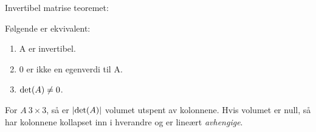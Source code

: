 Invertibel matrise teoremet:

Følgende er ekvivalent:
\begin{enumerate}
  \item A er invertibel.
  \item 0 er ikke en egenverdi til A.
  \item $\text{det}(A) \neq 0$.
\end{enumerate}

For $A\ 3\times 3$, så er $|\text{det}(A)|$ volumet utspent av kolonnene.
Hvis volumet er null, så har kolonnene kollapset inn i hverandre og er
lineært \emph{avhengige}.
